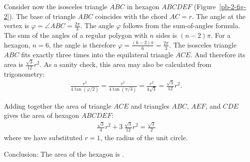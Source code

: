 Consider now the isosceles triangle $ABC$ in hexagon $ABCDEF$ (Figure~\ref{pb-2-fig-2}). The base of triangle $ABC$ coincides with the chord $AC=r$. The angle at the vertex is $\varphi={\angle}ABC=\frac{2\pi}{3}$. The angle $\varphi$ follows from the sum-of-angles formula. The sum of the angles of a regular polygon with $n$ sides is $(n-2)\pi$. For a hexagon, $n=6$, the angle is therefore $\varphi=\frac{(6-2)\pi}{6}=\frac{2\pi}{3}$. The isosceles triangle $ABC$ fits exactly three times into the equilateral triangle $ACE$. And therefore its area is $\frac{\sqrt{3}}{12}r^{2}$. As a sanity check, this area may also be calculated from trigonometry:
\begin{align*}
\frac{r^{2}}{4\tan(\varphi/2)}
= \frac{r^{2}}{4\tan(\pi/3)}
= \frac{r^{2}}{4\sqrt{3}}
= \frac{\sqrt{3}}{12}r^{2}.
\end{align*}

Adding together the area of triangle $ACE$ and triangles $ABC$, $AEF$, and $CDE$ gives the area of hexagon $ABCDEF$:
\begin{align*}
\frac{\sqrt{3}}{4}r^{2}
+ 3 \ \frac{\sqrt{3}}{12} r^{2}
= \frac{\sqrt{3}}{2}
\end{align*}
where we have substituted $r=1$, the radius of the unit circle.

Conclusion: The area of the hexagon is .



% 